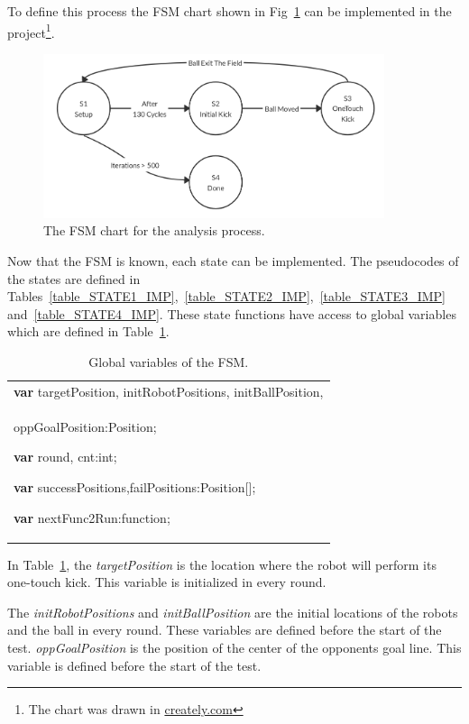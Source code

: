 \documentclass[runningheads]{llncs}
\begin{document}
To define this process the FSM chart shown in Fig~\ref{fig_ANALYZE_FSM} can be implemented in the project\footnote{The chart was drawn in \url{creately.com}}.

\begin{figure}
\centering
\includegraphics[width=10cm]{images/Analyze_FSM.png}\caption{The FSM chart for the analysis process.} \label{fig_ANALYZE_FSM}
\end{figure}

Now that the FSM is known, each state can be implemented. The pseudocodes of the states are defined in Tables~\ref{table_STATE1_IMP},~\ref{table_STATE2_IMP},~\ref{table_STATE3_IMP} and~\ref{table_STATE4_IMP}. These state functions have access to global variables which are defined in Table~\ref{table_GLOBAL_VARS}.

\begin{table}
\caption{Global variables of the FSM.}
\center
\label{table_GLOBAL_VARS}
\begin{tabular}{|p{10cm}|}
\hline
\textbf{var} 
targetPosition,
initRobotPositions,
initBallPosition,\\
\quad oppGoalPosition:Position;

\textbf{var}
round, cnt:int;

\textbf{var}
successPositions,failPositions:Position[];

\textbf{var}
nextFunc2Run:function;\\

\hline
\end{tabular}
\end{table}

In Table~\ref{table_GLOBAL_VARS}, the \textit{targetPosition} is the location where the robot will perform its one-touch kick. This variable is initialized in every round. 

The \textit{initRobotPositions} and \textit{initBallPosition} are the initial locations of the robots and the ball in every round. These variables are defined before the start of the test. \textit{oppGoalPosition} is the position of the center of the opponents goal line. This variable is defined before the start of the test.
\end{document}

